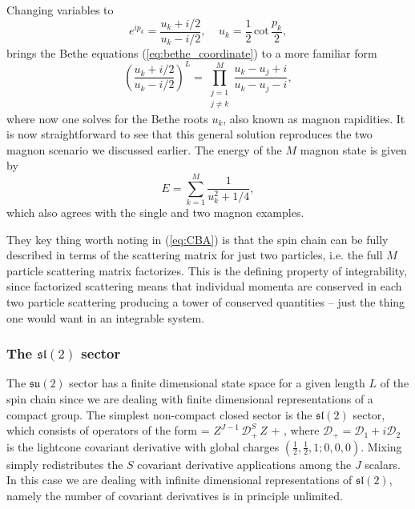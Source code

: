 Changing variables to
\begin{equation}
	\label{eq:up_param}
	e^{ip_k} = \frac{u_k + i/2}{u_k - i/2}, \;\;\;\; u_k = \frac{1}{2} \, \mathrm{cot} \, \frac{p_k}{2},
\end{equation}
brings the Bethe equations (\ref{eq:bethe_coordinate}) to a more familiar form
\begin{equation}
	\label{eq:su2_bae}
	\left( \frac{u_k + i/2}{u_k - i/2} \right)^L = \prod_{\substack{j=1 \\ j \neq k}}^M \frac{u_k - u_j + i}{u_k - u_j - i},
\end{equation}
where now one solves for the Bethe roots $u_k$, also known as magnon rapidities. 
It is now straightforward to see that this general solution reproduces the two magnon scenario we discussed earlier. 
The energy of the $M$ magnon state is given by
\begin{equation}
	E = \sum_{k=1}^M \frac{1}{u_k^2 + 1/4},
\end{equation}
 which also agrees with the single and two magnon examples. 
 
They key thing worth noting in (\ref{eq:CBA}) is that the spin chain can be fully described in terms of the scattering matrix for just two particles, i.e. the full $M$ particle scattering matrix factorizes.
This is the defining property of integrability, since factorized scattering means that individual momenta are conserved in each two particle scattering producing a tower of conserved quantities -- just the thing one would want in an integrable system. 
 
\subsubsection{The $\mathfrak{sl}(2)$ sector}
\label{sec:sl2_sector}

The $\mathfrak{su}(2)$ sector has a finite dimensional state space for a given length $L$ of the spin chain since we are dealing with finite dimensional representations of a compact group.
The simplest non-compact closed sector is the $\mathfrak{sl}(2)$ sector, which consists of operators of the form \cite{Beisert:2003yb}
\beq
	\label{eq:sl2_operators}
	 = \tr \( Z^{J-1} \, \mathcal{D}_+^S \, Z \) + ,
\eeq
where $\mathcal{D_+} = \mathcal{D}_1 + i \mathcal{D}_2$ is the lightcone covariant derivative with global charges $(\frac{1}{2},\frac{1}{2}, 1; 0,0,0)$. Mixing simply redistributes the $S$ covariant derivative applications among the $J$ scalars. In this case we are dealing with infinite dimensional representations of $\mathfrak{sl}(2)$, namely the number of covariant derivatives is in principle unlimited.


